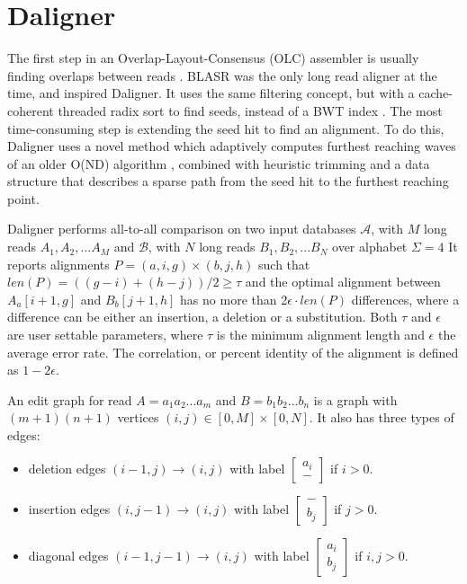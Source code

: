 \documentclass[../thesis.tex]{subfiles}
\begin{document}
\section{Daligner}
The first step in an Overlap-Layout-Consensus (OLC) assembler is usually finding overlaps between reads \cite{OLC}.
BLASR \cite{BLASR} was the only long read aligner at the time, and inspired Daligner.
It uses the same filtering concept, but with a cache-coherent threaded radix sort to find seeds, instead of a BWT index \cite{BWT}.
The most time-consuming step is extending the seed hit to find an alignment.
To do this, Daligner uses a novel method which adaptively computes furthest reaching waves of an older O(ND) algorithm \cite{O_ND}, combined with heuristic trimming and a data structure that describes a sparse path from the seed hit to the furthest reaching point.

Daligner performs all-to-all comparison on two input databases $\mathcal{A}$, with $M$ long reads $A_1, A_2,...A_M$ and $\mathcal{B}$, with $N$ long reads $B_1, B_2,...B_N$ over alphabet $\Sigma = 4$
It reports alignments $P = (a,i,g)\times(b,j,h)$ such that $len(P) = ((g-i)+(h-j))/2 \ge \tau$ and the optimal alignment between $A_a[i+1,g]$ and $B_b[j+1,h]$ has no more than 2$\epsilon \cdot len(P)$ differences, where a difference can be either an insertion, a deletion or a substitution.
Both $\tau$ and $\epsilon$ are user settable parameters, where $\tau$ is the minimum alignment length and $\epsilon$ the average error rate.
The correlation, or percent identity of the alignment is defined as $1-2\epsilon$.

An edit graph for read $A=a_1a_2...a_m$ and $B=b_1b_2...b_n$ is a graph with $(m+1)(n+1)$ vertices $(i,j) \in [0,M]\times[0,N]$.
It also has three types of edges:
\begin{itemize}
\item deletion edges $(i-1,j) \rightarrow (i,j)$ with label
{\small$\begin{bmatrix}
a_i \\ -
\end{bmatrix}$} if $i > 0$.
\item insertion edges $(i,j-1) \rightarrow (i,j)$ with label 
{\small$\begin{bmatrix}
- \\ b_j
\end{bmatrix}$} if $j > 0$.
\item diagonal edges $(i-1,j-1) \rightarrow (i,j)$ with label
{\small$\begin{bmatrix}
a_i \\ b_j
\end{bmatrix}$} if $i,j > 0$.
\end{itemize}
\end{document}
